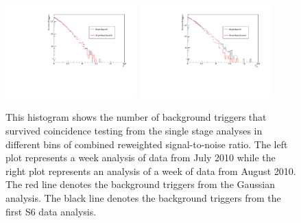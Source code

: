 \documentclass[12pt]{iopart} \usepackage{graphicx,amssymb}
\begin{document}
\begin{figure}[tbp]
\begin{center}
\includegraphics[width=0.45\textwidth]{figures/histograms/single_stage_hist_w1.pdf}
\includegraphics[width=0.45\textwidth]{figures/histograms/single_stage_hist_w2.pdf}
\caption{This histogram shows the number of background triggers that survived
coincidence testing from the single stage analyses in different bins of
combined reweighted signal-to-noise ratio. The left plot represents a week 
analysis of data from July
2010 while the right plot represents an analysis of a week of data from August 2010. The red
line denotes the background triggers from the Gaussian analysis. The black
line denotes the background triggers from the first S6 data analysis.}
\label{fig:ss_bg}
\end{center}
\end{figure}
\end{document}
